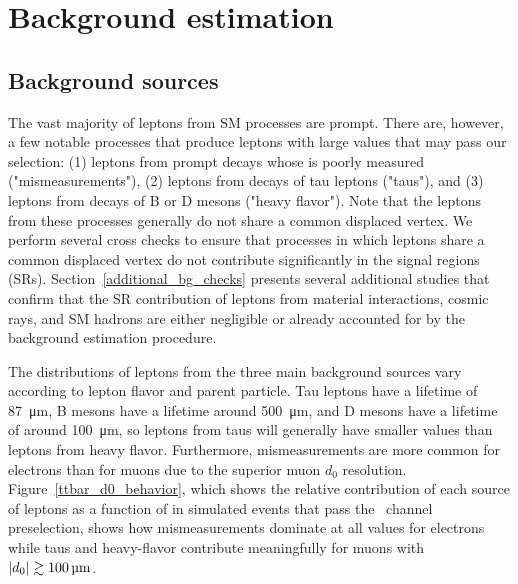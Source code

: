 \section{Background estimation}
\label{bg}
\subsection{Background sources}
\label{bg_sources}
The vast majority of leptons from SM processes are prompt. There are, however, a few notable processes that produce leptons with large \ad values that may pass our selection: (1) leptons from prompt decays whose \ad is poorly measured ("mismeasurements"), (2) leptons from  decays of tau leptons ("taus"), and (3) leptons from decays of B or D mesons ("heavy flavor"). Note that the leptons from these processes generally do not share a common displaced vertex. We perform several cross checks to ensure that processes in which leptons share a common displaced vertex do not contribute significantly in the signal regions (SRs). Section~\ref{additional_bg_checks} presents several additional studies that confirm that the SR contribution of leptons from material interactions, cosmic rays, and SM hadrons are either negligible or already accounted for by the background estimation procedure.

The \ad distributions of leptons from the three main background sources vary according to lepton flavor and parent particle. Tau leptons have a lifetime of \SI{87}{\um}, B mesons have a lifetime around \SI{500}{\um}, and D mesons have a lifetime of around \SI{100}{\um}, so leptons from taus will generally have smaller \ad values than leptons from heavy flavor. Furthermore, mismeasurements are more common for electrons than for muons due to the superior muon $d_0$ resolution. Figure~\ref{ttbar_d0_behavior}, which shows the relative contribution of each source of leptons as a function of \ad in simulated \ttbar events that pass the \Pe\Pgm\ channel preselection, shows how mismeasurements dominate at all \ad values for electrons while taus and heavy-flavor contribute meaningfully for muons with $\ad\gtrsim\SI{100}{\um}$.



